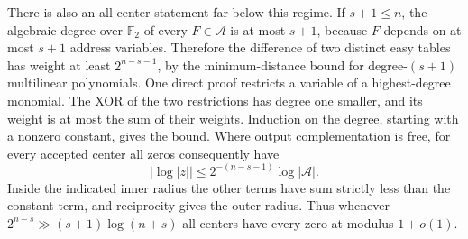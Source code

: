 There is also an all-center statement far below this regime. If $s+1\le n$, the algebraic degree over $\mathbb F_2$ of every $F\in\mathcal A$ is at most $s+1$, because $F$ depends on at most $s+1$ address variables. Therefore the difference of two distinct easy tables has weight at least $2^{n-s-1}$, by the minimum-distance bound for degree-$(s+1)$ multilinear polynomials. One direct proof restricts a variable of a highest-degree monomial. The XOR of the two restrictions has degree one smaller, and its weight is at most the sum of their weights. Induction on the degree, starting with a nonzero constant, gives the bound. Where output complementation is free, for every accepted center all zeros consequently have
\[
                |\log|z||\le 2^{-(n-s-1)}\log |\mathcal A|.
\]
Inside the indicated inner radius the other terms have sum strictly less than the constant term, and reciprocity gives the outer radius. Thus whenever $2^{n-s}\gg (s+1)\log(n+s)$ all centers have every zero at modulus $1+o(1)$.
